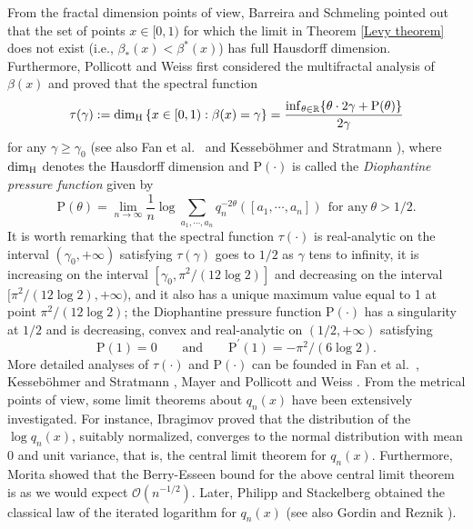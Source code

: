 \documentclass[reqno]{amsart}
\theoremstyle{definition}
\numberwithin{equation}{section}
\begin{document}
From the fractal dimension points of view, Barreira and Schmeling \cite{lesBS00} pointed out that the set of points $x \in [0,1)$ for which the limit in Theorem \ref{Levy theorem} does not exist (i.e., $\beta_*(x)<\beta^*(x)$) has full Hausdorff dimension.
Furthermore, Pollicott and Weiss \cite{lesPW99} first considered the multifractal analysis of $\beta(x)$ and proved that the spectral function
\[
\tau(\gamma):= \dim_{\rm H} \left\{x \in [0,1): \beta(x) = \gamma \right\} = \frac{\inf_{\theta \in \mathbb{R}}\{\theta\cdot 2\gamma + \mathrm{P}(\theta)\}}{2\gamma}
\]
for any $\gamma \geq \gamma_0$ (see also Fan et al.~\cite{lesF.L.W.W} and Kesseb\"{o}hmer and Stratmann \cite{lesKS07}),
where $\dim_{\rm H}$ denotes the Hausdorff dimension and $\mathrm{P}(\cdot)$ is called the \emph{Diophantine pressure function} given by
\[
\mathrm{P}(\theta) = \lim_{n \to \infty} \frac{1}{n} \log \sum_{a_1,\cdots,a_n} q_n^{-2\theta}([a_1,\cdots,a_n])\ \ \text{for any}\  \theta > 1/2.
\]
It is worth remarking that the spectral function $\tau(\cdot)$ is real-analytic on the interval $(\gamma_0,+\infty)$ satisfying $\tau(\gamma)$ goes to $1/2$ as $\gamma$ tens to infinity, it is increasing on the interval $[\gamma_0, \pi^2/(12\log2)]$ and decreasing on the interval $[\pi^2/(12\log2), +\infty)$, and it also has a unique maximum value equal to 1 at point $\pi^2/(12\log2)$; the Diophantine pressure function $\mathrm{P}(\cdot)$ has a singularity at $1/2$ and is decreasing, convex and real-analytic on $(1/2,+\infty)$ satisfying
\begin{equation}\label{ele}
\mathrm{P}(1)=0\ \ \ \ \ \ \ \ \ \text{and}\ \ \ \ \ \ \ \ \ \mathrm{P}^\prime(1)=-\pi^2/(6\log 2).
\end{equation}
More detailed analyses of $\tau(\cdot)$ and $\mathrm{P}(\cdot)$ can be founded in Fan et al.~\cite{lesF.L.W.W}, Kesseb\"{o}hmer and Stratmann \cite{lesKS07}, Mayer \cite{lesMay90} and Pollicott and Weiss \cite{lesPW99}. From the metrical points of view, some limit theorems about $q_n(x)$ have been extensively investigated.
For instance, Ibragimov \cite{lesIbr61} proved that the distribution of the $\log q_n(x)$, suitably normalized, converges to the normal distribution with mean 0 and unit variance, that is, the central limit theorem for $q_n(x)$. Furthermore, Morita \cite{lesMor94} showed that the Berry-Esseen bound for the above central limit theorem is as we would expect $\mathcal{O}(n^{-1/2})$. Later, Philipp and Stackelberg \cite{lesPS69} obtained the classical law of the iterated logarithm for $q_n(x)$ (see also Gordin and Reznik \cite{lesGR70}).
\end{document}
